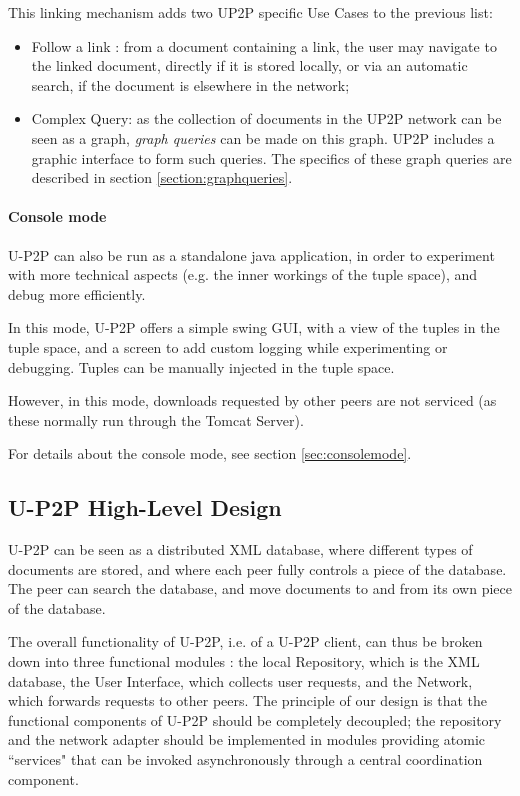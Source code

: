 \documentclass[titlepage]{article}%
\begin{document}
This linking mechanism adds two UP2P specific Use Cases to the previous list:
\begin{itemize}
\item Follow a link : from a document containing a link, the user may navigate to the linked document, directly if it is stored locally, or via an automatic search, if the document is elsewhere in the network;
\item Complex Query: as the collection of documents in the UP2P network can be seen as a graph, \emph{graph queries} can be made on this graph. UP2P includes a graphic interface to form such queries. The specifics of these graph queries are described in section \ref{section:graphqueries}.
\end{itemize}

\paragraph{Console mode}
U-P2P can also be run as a standalone java application, in order to experiment with more technical aspects (e.g. the inner workings of the tuple space), and debug more efficiently.

In this mode, U-P2P offers a simple swing GUI, with a view of the tuples in the tuple space, and a screen to add custom logging while experimenting or debugging. Tuples can be manually injected in the tuple space.

However, in this mode, downloads requested by other peers are not serviced (as these normally run through the Tomcat Server).

For details about the console mode, see section \ref{sec:consolemode}.

\subsection{U-P2P High-Level Design} %

U-P2P can be seen as a distributed XML database, where different types of documents are stored, and where each peer fully controls a piece of the database. The peer can search the database, and move documents to and from its own piece of the database.

The overall functionality of U-P2P, i.e. of a U-P2P client, can thus be broken down into three functional modules : the local Repository, which is the XML database, the User Interface, which collects user requests, and the Network, which forwards requests to other peers. The principle of our design is that the functional components of U-P2P should be completely decoupled; the repository and the network adapter should be implemented in modules providing atomic ``services" that can be invoked asynchronously through a central coordination component.
\end{document}
